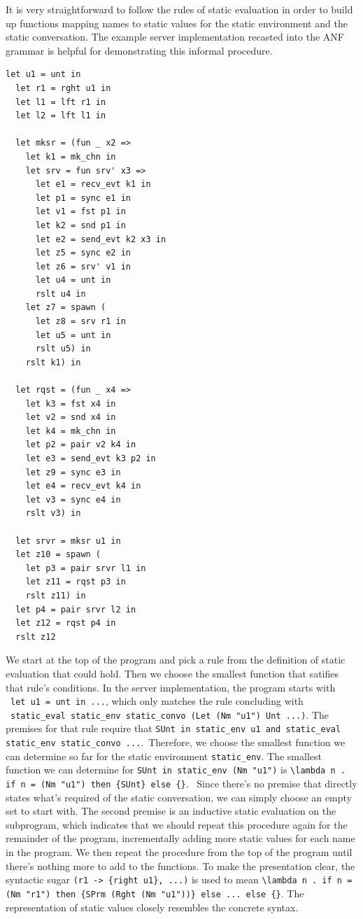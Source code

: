 \documentclass{article}
\begin{document}
It is very straightforward to follow the rules of static evaluation in order to build up
functions mapping names to static values for the static environment
and the static conversation.
The example server implementation recasted into the
ANF grammar is helpful for demonstrating this
informal procedure.

\begin{lstlisting}[language=normal_lang, mathescape]
  let u1 = unt in
  let r1 = rght u1 in
  let l1 = lft r1 in
  let l2 = lft l1 in

  let mksr = (fun _ x2 => 
    let k1 = mk_chn in
    let srv = fun srv' x3 =>
      let e1 = recv_evt k1 in
      let p1 = sync e1 in
      let v1 = fst p1 in
      let k2 = snd p1 in 
      let e2 = send_evt k2 x3 in
      let z5 = sync e2 in
      let z6 = srv' v1 in
      let u4 = unt in
      rslt u4 in
    let z7 = spawn (
      let z8 = srv r1 in
      let u5 = unt in
      rslt u5) in
    rslt k1) in

  let rqst = (fun _ x4 =>
    let k3 = fst x4 in
    let v2 = snd x4 in
    let k4 = mk_chn in
    let p2 = pair v2 k4 in
    let e3 = send_evt k3 p2 in
    let z9 = sync e3 in
    let e4 = recv_evt k4 in
    let v3 = sync e4 in
    rslt v3) in

  let srvr = mksr u1 in
  let z10 = spawn ( 
    let p3 = pair srvr l1 in
    let z11 = rqst p3 in
    rslt z11) in
  let p4 = pair srvr l2 in
  let z12 = rqst p4 in
  rslt z12
  \end{lstlisting}


We start at the top of the program and pick a
rule from the definition of static evaluation that
could hold. Then we choose the smallest function that satifies that rule's conditions. 
In the server implementation, the program starts with \
\lstinline[language=normal_lang, mathescape]{let u1 = unt in ...}, which only matches
the rule concluding with \
\lstinline[language=logic, mathescape]{static_eval static_env static_convo (Let (Nm "u1") Unt ...)}. 
The premises for that rule require that 
\lstinline[language=logic, mathescape]{SUnt in static_env u1 and static_eval static_env static_convo ...}.\
Therefore, we choose the smallest function we can determine so far for the static environment
\lstinline{static_env}. The smallest function we can determine for 
\lstinline[language=logic]{SUnt in static_env (Nm "u1")} is 
\lstinline[language=logic]|\lambda n . if n = (Nm "u1") then {SUnt} else {}|. \
Since
there's no premise that directly states what's required of the static conversation, we can
simply choose an empty set to start with. The second premise is an inductive static evaluation on
the subprogram, which indicates that we should repeat this procedure again for the remainder of
the program, incrementally adding more static values for each name in the program.  We then repeat
the procedure from the top of the program until there's nothing more to add to the functions.
To make the presentation clear, the syntactic sugar \lstinline|(r1 -> {right u1}, ...)| is used 
to mean
\lstinline[language=logic]|\lambda n . if n = (Nm "r1") then {SPrm (Rght (Nm "u1"))} else ... else {}|.
The representation of static values closely resembles the concrete syntax.
\end{document}
